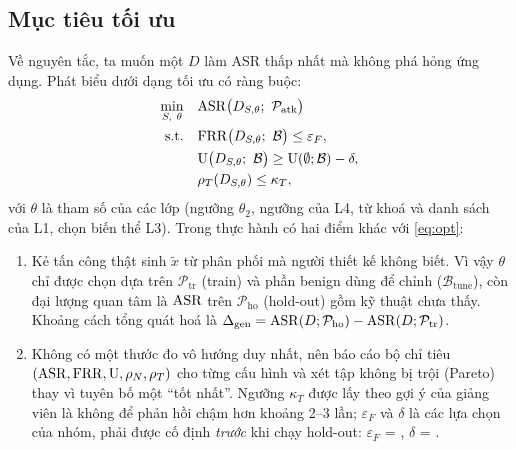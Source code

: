 \subsection{Mục tiêu tối ưu}
Về nguyên tắc, ta muốn một $D$ làm ASR thấp nhất mà không phá hỏng ứng dụng. Phát biểu dưới dạng tối ưu có ràng buộc:
\begin{equation}\label{eq:opt}
  \begin{aligned}
    \min_{S,\ \theta}\quad & \ASR\bigl(D_{S,\theta};\ \mathcal{P}_{\mathrm{atk}}\bigr)\\
    \text{s.t.}\quad & \FRR\bigl(D_{S,\theta};\ \mathcal{B}\bigr)\le \varepsilon_F,\\
                     & \Util\bigl(D_{S,\theta};\ \mathcal{B}\bigr)\ge \Util(\emptyset;\mathcal{B})-\delta,\\
                     & \rho_T(D_{S,\theta})\le \kappa_T,
  \end{aligned}
\end{equation}
với $\theta$ là tham số của các lớp (ngưỡng $\theta_2$, ngưỡng của L4, từ khoá và danh sách của L1, chọn biến thể L3). Trong thực hành có hai điểm khác với \eqref{eq:opt}:
\begin{enumerate}[label=(\roman*)]
  \item Kẻ tấn công thật sinh $\tilde{x}$ từ phân phối mà người thiết kế không biết. Vì vậy $\theta$ chỉ được chọn dựa trên $\mathcal{P}_{\mathrm{tr}}$ (train) và phần benign dùng để chỉnh ($\mathcal{B}_{\mathrm{tune}}$), còn đại lượng quan tâm là $\mathrm{ASR}$ trên $\mathcal{P}_{\mathrm{ho}}$ (hold-out) gồm kỹ thuật chưa thấy. Khoảng cách tổng quát hoá là $\Delta_{\mathrm{gen}} = \mathrm{ASR}(D;\mathcal{P}_{\mathrm{ho}}) - \mathrm{ASR}(D;\mathcal{P}_{\mathrm{tr}})$.
  \item Không có một thước đo vô hướng duy nhất, nên báo cáo bộ chỉ tiêu $(\mathrm{ASR},\mathrm{FRR},\mathrm{U},\rho_N,\rho_T)$ cho từng cấu hình và xét tập không bị trội (Pareto) thay vì tuyên bố một ``tốt nhất''. Ngưỡng $\kappa_T$ được lấy theo gợi ý của giảng viên là không để phản hồi chậm hơn khoảng 2--3 lần; $\varepsilon_F$ và $\delta$ là các lựa chọn của nhóm, phải được cố định \emph{trước} khi chạy hold-out: $\varepsilon_F$ = , $\delta$ = .
\end{enumerate}

